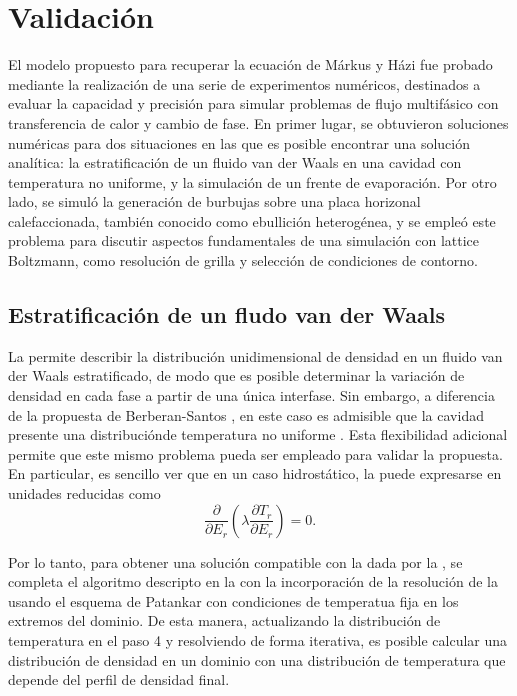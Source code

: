 \section{Validaci\'on}

El modelo propuesto para recuperar la ecuaci\'on de M\'arkus y H\'azi fue probado mediante la realizaci\'on de una serie de experimentos num\'ericos, destinados a evaluar la capacidad y precisi\'on para simular problemas de flujo multif\'asico con transferencia de calor y cambio de fase. En primer lugar, se obtuvieron soluciones num\'ericas para dos situaciones en las que es posible encontrar una soluci\'on anal\'itica: la estratificaci\'on de un fluido van der Waals en una cavidad con temperatura no uniforme, y la simulaci\'on de un frente de evaporaci\'on. Por otro lado, se simul\'o la generaci\'on de burbujas sobre una placa horizonal calefaccionada, tambi\'en conocido como ebullici\'on heterog\'enea, y se emple\'o este problema para discutir aspectos fundamentales de una simulaci\'on con lattice Boltzmann, como resoluci\'on de grilla y selecci\'on de condiciones de contorno.




\subsection{Estratificaci\'on de un fludo van der Waals}
\label{sec:vdWColumnHT}

La  permite describir la distribuci\'on unidimensional de densidad en un fluido van der Waals estratificado, de modo que es posible determinar la variaci\'on de densidad en cada fase a partir de una \'unica interfase. Sin embargo, a diferencia de la propuesta de Berberan-Santos \cite{berberan-santos_liquidvapor_2002}, en este caso es admisible que la cavidad presente una distribuci\'onde temperatura no uniforme \cite{fogliatto_simulation_2019}. Esta flexibilidad adicional permite que este mismo problema pueda ser empleado para validar la \lbe{} propuesta. En particular, es sencillo ver que en un caso hidrost\'atico, la  puede expresarse en unidades reducidas como
\begin{equation}
	\dfrac{\partial}{\partial E_r} \left( \lambda \dfrac{\partial T_r}{\partial E_r} \right) = 0.
	\label{eq:markus_1d}
\end{equation}

Por lo tanto, para obtener una soluci\'on compatible con la \lbe{} dada por la , se completa el algoritmo descripto en la  con la incorporaci\'on de la resoluci\'on de la  usando el esquema de Patankar \cite{patankar_numerical_1980} con condiciones de temperatua fija en los extremos del dominio. De esta manera, actualizando la distribuci\'on de temperatura en el paso 4 y resolviendo de forma iterativa, es posible calcular una distribuci\'on de densidad en un dominio con una distribuci\'on de temperatura que depende del perfil de densidad final. 

